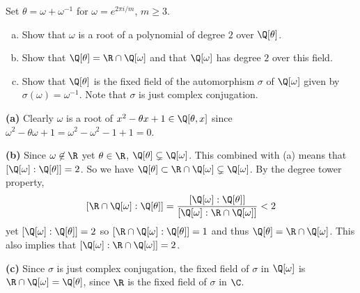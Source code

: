 \documentclass[11pt,letterpaper]{article}
\begin{document}
\begin{cproblem}{2.35}
    Set $\theta=\omega+\omega^{-1}$ for $\omega=e^{2\pi i /m}$, $m\geq 3$.
    \begin{enumerate}[(a)]
        \item Show that $\omega$ is a root of a polynomial of degree $2$ over $\Q[\theta]$. 
        \item Show that $\Q[\theta]=\R\cap \Q[\omega]$ and that $\Q[\omega]$ has degree $2$ over this field.
        \item Show that $\Q[\theta]$ is the fixed field of the automorphism $\sigma$ of $\Q[\omega]$ given by $\sigma(\omega)=\omega^{-1}$. Note that $\sigma$ is just complex conjugation. 
    \end{enumerate}
\end{cproblem}

\begin{solution}
    \textbf{(a)} Clearly $\omega$ is a root of $x^2-\theta x+1\in \Q[\theta, x]$ since $\omega^2-\theta \omega+1=\omega^2-\omega^2-1+1=0$.
    
    \textbf{(b)} Since $\omega\not\in \R$ yet $\theta\in \R$, $\Q[\theta]\subsetneq \Q[\omega]$. This combined with (a) means that $[\Q[\omega] : \Q[\theta]]=2$. So we have $\Q[\theta]\subset \R\cap \Q[\omega]\subsetneq \Q[\omega]$. By the degree tower property, 
    \[
        [\R\cap \Q[\omega]:\Q[\theta]]=\frac{[\Q[\omega]:\Q[\theta]]}{[\Q[\omega] : \R\cap \Q[\omega]]}<2
    \]  
    yet $[\Q[\omega]:\Q[\theta]]=2$ so $[\R\cap \Q[\omega]:\Q[\theta]]=1$ and thus $\Q[\theta]=\R\cap \Q[\omega]$. This also implies that $[\Q[\omega] : \R\cap \Q[\omega]]=2$.    
    
    \textbf{(c)} Since $\sigma$ is just complex conjugation, the fixed field of $\sigma$ in $\Q[\omega]$ is $\R\cap \Q[\omega]=\Q[\theta]$, since $\R$ is the fixed field of $\sigma$ in $\C$. 
\end{solution}
\end{document}
